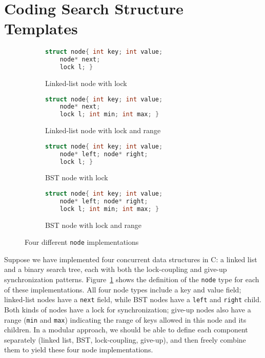 \documentclass[sigplan,screen]{acmart}
\begin{document}
\section{Coding Search Structure Templates}
\begin{figure}
  \begin{subfigure}[t]{.4\textwidth}
  \begin{lstlisting}[language=C, style=myStyle]
  struct node{ int key; int value;
    node* next;
    lock l; }
  \end{lstlisting}
    \caption{Linked-list node with lock}
  \end{subfigure}
  \hfill
  \begin{subfigure}[t]{.4\textwidth}
  \begin{lstlisting}[language=C, style=myStyle]
  struct node{ int key; int value;
    node* next;
    lock l; int min; int max; }
  \end{lstlisting}
    \caption{Linked-list node with lock and range}
  \end{subfigure}

  \medskip

  \begin{subfigure}[t]{.4\textwidth}
  \begin{lstlisting}[language=C, style=myStyle,numbers=none]
  struct node{ int key; int value;
    node* left; node* right;
    lock l; }
  \end{lstlisting}
    \caption{BST node with lock}
  \end{subfigure}
  \hfill
  \begin{subfigure}[t]{.4\textwidth}
  \begin{lstlisting}[language=C, style=myStyle]
  struct node{ int key; int value;
    node* left; node* right;
    lock l; int min; int max; }
  \end{lstlisting}
    \caption{BST node with lock and range}
  \end{subfigure}
  \caption{Four different \lstinline{node} implementations}
  \label{node-impls}
\end{figure}

Suppose we have implemented four concurrent data structures in C: a linked list and a binary search tree, each with both the lock-coupling and give-up synchronization patterns. Figure~\ref{node-impls} shows the definition of the \lstinline{node} type for each of these implementations. All four node types include a key and value field; linked-list nodes have a \lstinline{next} field, while BST nodes have a \lstinline{left} and \lstinline{right} child. Both kinds of nodes have a lock for synchronization; give-up nodes also have a range (\lstinline{min} and \lstinline{max}) indicating the range of keys allowed in this node and its children. In a modular approach, we should be able to define each component separately (linked list, BST, lock-coupling, give-up), and then freely combine them to yield these four node implementations.
\end{document}
